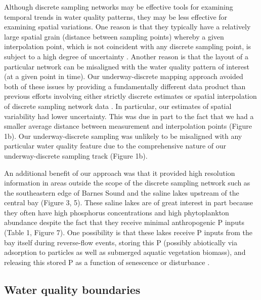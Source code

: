 \documentclass[review]{elsarticle}
\begin{document}
Although discrete sampling networks may be effective tools for examining temporal trends in water quality patterns, they may be less effective for examining spatial variations. One reason is that they typically have a relatively large spatial grain (distance between sampling points) whereby a given interpolation point, which is not coincident with any discrete sampling point, is subject to a high degree of uncertainty \citep{anttila2008feasible}. Another reason is that the layout of a particular network can be misaligned with the water quality pattern of interest (at a given point in time). Our underway-discrete mapping approach avoided both of these issues by providing a fundamentally different data product than previous efforts involving either strictly discrete estimates or spatial interpolation of discrete sampling network data \citep{fourqurean1993process}. In particular, our estimates of spatial variability had lower uncertainty. This was due in part to the fact that we had a smaller average distance between measurement and interpolation points (Figure 1b). Our underway-discrete sampling was unlikely to be misaligned with any particular water quality feature due to the comprehensive nature of our underway-discrete sampling track (Figure 1b). 

An additional benefit of our approach was that it provided high resolution information in areas outside the scope of the discrete sampling network such as the southeastern edge of Barnes Sound and the saline lakes upstream of the central bay (Figure 3, 5). These saline lakes are of great interest in part because they often have high phosphorus concentrations and high phytoplankton abundance despite the fact that they receive minimal anthropogenic P inputs (Table 1, Figure 7). One possibility is that these lakes receive P inputs from the bay itself during reverse-flow events, storing this P (possibly abiotically via adsorption to particles as well as submerged aquatic vegetation biomass), and releasing this stored P as a function of senescence or disturbance \citep{rudnick1999phosphorus}.

\subsection{Water quality boundaries}
\end{document}
